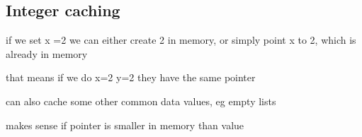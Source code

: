 
\subsection{Integer caching}


if we set x =2  we can either create 2 in memory, or simply point x to 2, which is already in memory

that means if we do x=2 y=2 they have the same pointer

can also cache some other common data values, eg empty lists

makes sense if pointer is smaller in memory than value

